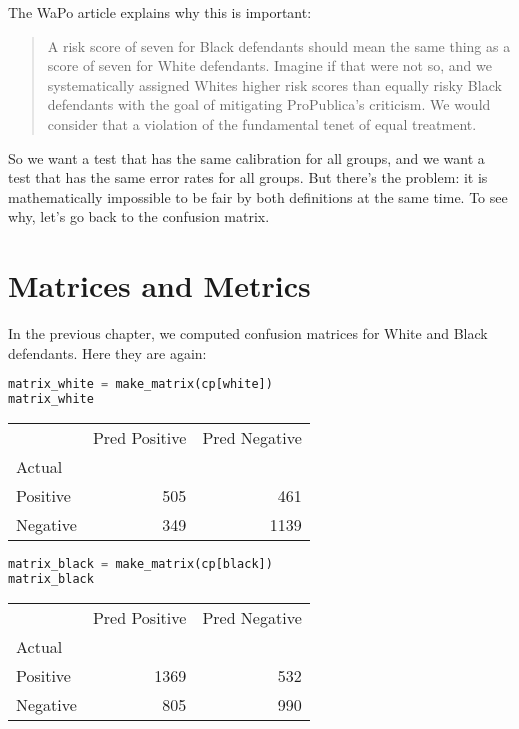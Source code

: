 The WaPo article explains why this is important:

\begin{quote}
A risk score of seven for Black defendants should mean the same thing as
a score of seven for White defendants. Imagine if that were not so, and
we systematically assigned Whites higher risk scores than equally risky
Black defendants with the goal of mitigating ProPublica's criticism. We
would consider that a violation of the fundamental tenet of equal
treatment.
\end{quote}

So we want a test that has the same calibration for all groups, and we
want a test that has the same error rates for all groups. But there's
the problem: it is mathematically impossible to be fair by both
definitions at the same time. To see why, let's go back to the confusion
matrix.

\section{Matrices and Metrics}\label{matrices-and-metrics}

In the previous chapter, we computed confusion matrices for White and
Black defendants. Here they are again:

\begin{lstlisting}[language=Python,style=source]
matrix_white = make_matrix(cp[white])
matrix_white
\end{lstlisting}

\begin{tabular}{lrr}
\toprule
 & Pred Positive & Pred Negative \\
Actual &  &  \\
\midrule
Positive & 505 & 461 \\
Negative & 349 & 1139 \\
\bottomrule
\end{tabular}

\begin{lstlisting}[language=Python,style=source]
matrix_black = make_matrix(cp[black])
matrix_black
\end{lstlisting}

\begin{tabular}{lrr}
\toprule
 & Pred Positive & Pred Negative \\
Actual &  &  \\
\midrule
Positive & 1369 & 532 \\
Negative & 805 & 990 \\
\bottomrule
\end{tabular}

